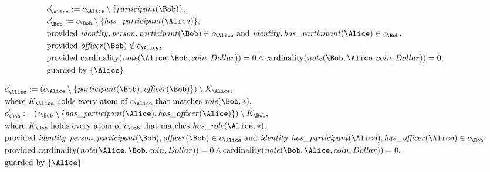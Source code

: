 \begin{align*}
&
c'_
{
\Alice
}
 := 
c_
{
\Alice
}
 \setminus 
\{
\mathit{\detokenize{
participant
}}
(
\Bob
)
\}
,\\
&
c'_
{
\Bob
}
 := 
c_
{
\Bob
}
 \setminus 
\{
\mathit{\detokenize{
has_participant
}}
(
\Alice
)
\}
,\\
&
\text{provided } 
\mathit{\detokenize{
identity
}}
,
\mathit{\detokenize{
person
}}
,
\mathit{\detokenize{
participant
}}
(
\Bob
)
 \in c_
{
\Alice
}
 \text{ and } 
\mathit{\detokenize{
identity
}}
,
\mathit{\detokenize{
has_participant
}}
(
\Alice
)
 \in c_
{
\Bob
}
,\\
&
\text{provided } 
\mathit{\detokenize{
officer
}}
(
\Bob
)
 \notin c_
{
\Alice
}
,\\
&
\text{provided } 
\mathrm{cardinality}(
\mathit{\detokenize{
note
}}
(
\Alice
,
\Bob
,
coin
,
Dollar
)
)
=
0
\land
\mathrm{cardinality}(
\mathit{\detokenize{
note
}}
(
\Bob
,
\Alice
,
coin
,
Dollar
)
)
=
0
,\\
&
\text{guarded by } \{
\Alice
\}
\end{align*}

\begin{align*}
&
c'_
{
\Alice
}
 := 
(c_
{
\Alice
}
 \setminus 
\{
\mathit{\detokenize{
participant
}}
(
\Bob
)
,
\mathit{\detokenize{
officer
}}
(
\Bob
)
\}
) \setminus K_
{
\Alice
}
,\\
&
\text{where } K_
{
\Alice
}
 \text{ holds every atom of } c_
{
\Alice
}
 \text{ that matches } 
\mathit{\detokenize{
role
}}
(
\Bob
,
\ast
)
,\\
&
c'_
{
\Bob
}
 := 
(c_
{
\Bob
}
 \setminus 
\{
\mathit{\detokenize{
has_participant
}}
(
\Alice
)
,
\mathit{\detokenize{
has_officer
}}
(
\Alice
)
\}
) \setminus K_
{
\Bob
}
,\\
&
\text{where } K_
{
\Bob
}
 \text{ holds every atom of } c_
{
\Bob
}
 \text{ that matches } 
\mathit{\detokenize{
has_role
}}
(
\Alice
,
\ast
)
,\\
&
\text{provided } 
\mathit{\detokenize{
identity
}}
,
\mathit{\detokenize{
person
}}
,
\mathit{\detokenize{
participant
}}
(
\Bob
)
,
\mathit{\detokenize{
officer
}}
(
\Bob
)
 \in c_
{
\Alice
}
 \text{ and } 
\mathit{\detokenize{
identity
}}
,
\mathit{\detokenize{
has_participant
}}
(
\Alice
)
,
\mathit{\detokenize{
has_officer
}}
(
\Alice
)
 \in c_
{
\Bob
}
,\\
&
\text{provided } 
\mathrm{cardinality}(
\mathit{\detokenize{
note
}}
(
\Alice
,
\Bob
,
coin
,
Dollar
)
)
=
0
\land
\mathrm{cardinality}(
\mathit{\detokenize{
note
}}
(
\Bob
,
\Alice
,
coin
,
Dollar
)
)
=
0
,\\
&
\text{guarded by } \{
\Alice
\}
\end{align*}
